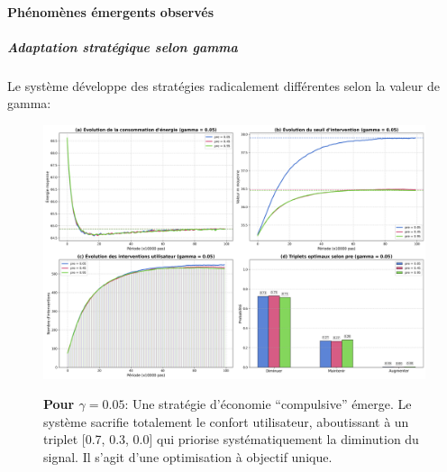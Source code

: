 \documentclass[a4paper,11pt]{article}
\begin{document}
\paragraph{Phénomènes émergents observés}

\subparagraph{Adaptation stratégique selon gamma}
Le système développe des stratégies radicalement différentes selon la valeur de gamma:

\begin{figure}[!htbp]
    \begin{minipage}[c]{0.48\textwidth}
        \includegraphics[width=\textwidth]{figures/experience4_gamma_0.05.png}
    \end{minipage}
    \hfill
    \begin{minipage}[c]{0.48\textwidth}
        \textbf{Pour $\gamma=0.05$}: Une stratégie d'économie ``compulsive'' émerge. Le système sacrifie totalement le confort utilisateur, aboutissant à un triplet [0.7, 0.3, 0.0] qui priorise systématiquement la diminution du signal. Il s'agit d'une optimisation à objectif unique.
    \end{minipage}
    
    \vspace{1em}
\end{figure}
\end{document}
